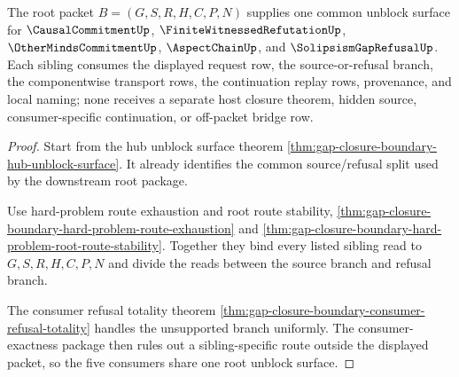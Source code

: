 \begin{theorem}
\label{thm:gap-closure-boundary-five-sibling-unblock-surface}
The root packet $B=(G,S,R,H,C,P,N)$ supplies one common unblock surface for $\CausalCommitmentUp$, $\FiniteWitnessedRefutationUp$, $\OtherMindsCommitmentUp$, $\AspectChainUp$, and $\SolipsismGapRefusalUp$. Each sibling consumes the displayed request row, the source-or-refusal branch, the componentwise transport rows, the continuation replay rows, provenance, and local naming; none receives a separate host closure theorem, hidden source, consumer-specific continuation, or off-packet bridge row.
\end{theorem}
\begin{proof}
Start from the hub unblock surface theorem \autoref{thm:gap-closure-boundary-hub-unblock-surface}. It already identifies the common source/refusal split used by the downstream root package.

Use hard-problem route exhaustion and root route stability, \autoref{thm:gap-closure-boundary-hard-problem-route-exhaustion} and \autoref{thm:gap-closure-boundary-hard-problem-root-route-stability}. Together they bind every listed sibling read to $G,S,R,H,C,P,N$ and divide the reads between the source branch and refusal branch.

The consumer refusal totality theorem \autoref{thm:gap-closure-boundary-consumer-refusal-totality} handles the unsupported branch uniformly. The consumer-exactness package then rules out a sibling-specific route outside the displayed packet, so the five consumers share one root unblock surface.
\end{proof}
